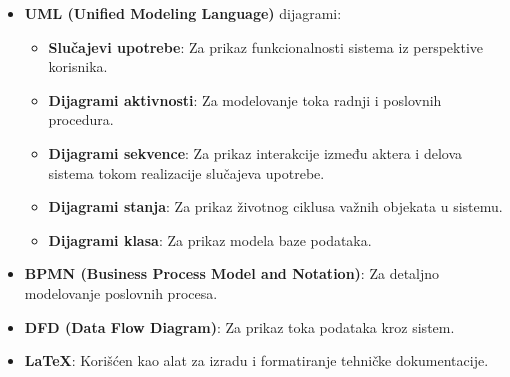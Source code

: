 \begin{itemize}
	\item \textbf{UML (Unified Modeling Language)} dijagrami:
	\begin{itemize}
		\item \textbf{Slučajevi upotrebe}: Za prikaz funkcionalnosti sistema iz perspektive korisnika.
		\item \textbf{Dijagrami aktivnosti}: Za modelovanje toka radnji i poslovnih procedura.
		\item \textbf{Dijagrami sekvence}: Za prikaz interakcije između aktera i delova sistema tokom realizacije slučajeva upotrebe.
		\item \textbf{Dijagrami stanja}: Za prikaz životnog ciklusa važnih objekata u sistemu.
		\item \textbf{Dijagrami klasa}: Za prikaz modela baze podataka.
	\end{itemize}
	\item \textbf{BPMN (Business Process Model and Notation)}: Za detaljno modelovanje poslovnih procesa.
	\item \textbf{DFD (Data Flow Diagram)}: Za prikaz toka podataka kroz sistem.
	\item \textbf{LaTeX}: Korišćen kao alat za izradu i formatiranje tehničke dokumentacije.
\end{itemize}